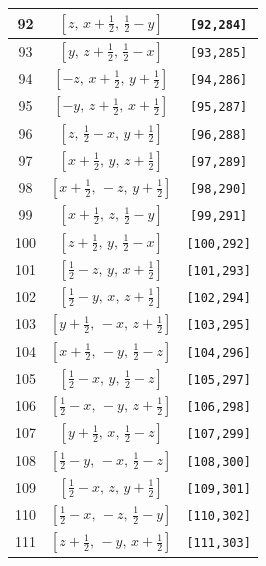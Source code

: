 \documentclass[fleqn,8pt]{jsarticle}
\begin{document}
\begin{longtable}{ccc}
92 & $\left[ z,\, x + \frac{1}{2},\, \frac{1}{2} - y \right]$ & {\tt [92,284]} \\ \hline
93 & $\left[ y,\, z + \frac{1}{2},\, \frac{1}{2} - x \right]$ & {\tt [93,285]} \\ \hline
94 & $\left[ - z,\, x + \frac{1}{2},\, y + \frac{1}{2} \right]$ & {\tt [94,286]} \\ \hline
95 & $\left[ - y,\, z + \frac{1}{2},\, x + \frac{1}{2} \right]$ & {\tt [95,287]} \\ \hline
96 & $\left[ z,\, \frac{1}{2} - x,\, y + \frac{1}{2} \right]$ & {\tt [96,288]} \\ \hline
97 & $\left[ x + \frac{1}{2},\, y,\, z + \frac{1}{2} \right]$ & {\tt [97,289]} \\ \hline
98 & $\left[ x + \frac{1}{2},\, - z,\, y + \frac{1}{2} \right]$ & {\tt [98,290]} \\ \hline
99 & $\left[ x + \frac{1}{2},\, z,\, \frac{1}{2} - y \right]$ & {\tt [99,291]} \\ \hline
100 & $\left[ z + \frac{1}{2},\, y,\, \frac{1}{2} - x \right]$ & {\tt [100,292]} \\ \hline
101 & $\left[ \frac{1}{2} - z,\, y,\, x + \frac{1}{2} \right]$ & {\tt [101,293]} \\ \hline
102 & $\left[ \frac{1}{2} - y,\, x,\, z + \frac{1}{2} \right]$ & {\tt [102,294]} \\ \hline
103 & $\left[ y + \frac{1}{2},\, - x,\, z + \frac{1}{2} \right]$ & {\tt [103,295]} \\ \hline
104 & $\left[ x + \frac{1}{2},\, - y,\, \frac{1}{2} - z \right]$ & {\tt [104,296]} \\ \hline
105 & $\left[ \frac{1}{2} - x,\, y,\, \frac{1}{2} - z \right]$ & {\tt [105,297]} \\ \hline
106 & $\left[ \frac{1}{2} - x,\, - y,\, z + \frac{1}{2} \right]$ & {\tt [106,298]} \\ \hline
107 & $\left[ y + \frac{1}{2},\, x,\, \frac{1}{2} - z \right]$ & {\tt [107,299]} \\ \hline
108 & $\left[ \frac{1}{2} - y,\, - x,\, \frac{1}{2} - z \right]$ & {\tt [108,300]} \\ \hline
109 & $\left[ \frac{1}{2} - x,\, z,\, y + \frac{1}{2} \right]$ & {\tt [109,301]} \\ \hline
110 & $\left[ \frac{1}{2} - x,\, - z,\, \frac{1}{2} - y \right]$ & {\tt [110,302]} \\ \hline
111 & $\left[ z + \frac{1}{2},\, - y,\, x + \frac{1}{2} \right]$ & {\tt [111,303]} \\ \hline

\end{longtable}
\end{document}
